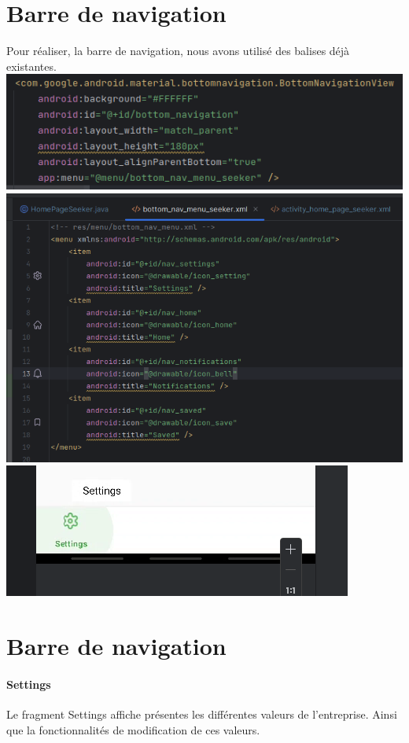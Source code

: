 \documentclass[a4paper]{article}
\begin{document}
\begin{multicols}{2}
        \section{Barre de navigation}
        Pour réaliser, la barre de navigation, nous avons utilisé des balises déjà existantes.
        \noindent\includegraphics[width=.49\textwidth]{xmlNavBarA}
        \noindent\includegraphics[width=.49\textwidth]{xmlNavBarB}
        \noindent\includegraphics[width=.49\textwidth]{navBar}
        \section{Barre de navigation}
        \paragraph{Settings}
        Le fragment Settings affiche présentes les différentes valeurs de l'entreprise. Ainsi que la fonctionnalités de modification de ces valeurs.


                

\end{multicols}
\end{document}
